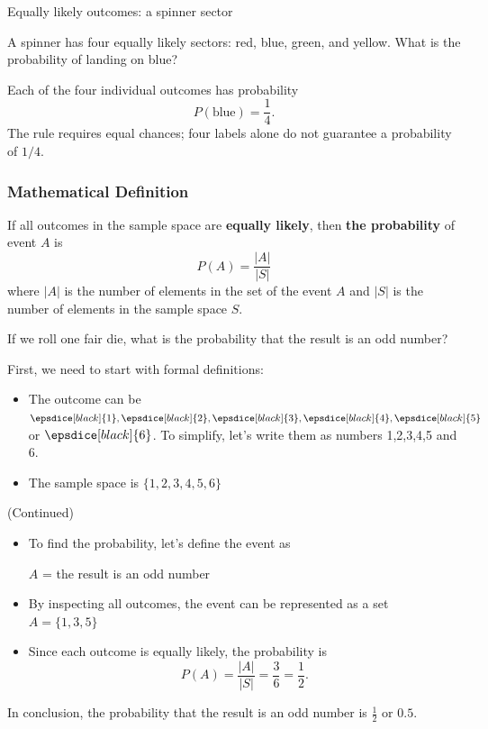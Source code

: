 \begin{frame}[t]{Equally likely outcomes: a spinner sector}
\small
\begin{ex}
A spinner has four equally likely sectors: red, blue, green, and yellow. What is the probability of landing on blue?
\end{ex}
\begin{sol}
Each of the four individual outcomes has probability\[P(\text{blue})=\frac14.\] The rule requires equal chances; four labels alone do not guarantee a probability of $1/4$.
\end{sol}
\end{frame}


\begin{frame}
\frametitle{Mathematical Definition}
\begin{defn}{}{}
If all outcomes in the sample space are \textbf{equally likely}, then \textbf{the probability} of event $A$ is 
\begin{equation}
P(A) = \frac{|A|}{|S|}
\end{equation}
where $|A|$ is the number of elements in the set of the event $A$ and $|S|$ is the number of elements in the sample space $S$. \pause
\end{defn}
\end{frame}


\begin{frame}[t]
\begin{ex}
If we roll one fair die, what is the probability that the result is an odd number?
\end{ex}
\begin{sol}
First, we need to start with formal definitions:
\begin{itemize}
\item The outcome can be $\epsdice[black]{1}, \epsdice[black]{2}, \epsdice[black]{3}, \epsdice[black]{4}, \epsdice[black]{5}$ or $\epsdice[black]{6}$. To simplify, let's write them as numbers 1,2,3,4,5 and 6.
\item The sample space is $\{1,2,3,4,5,6\}$
\end{itemize}
\end{sol}
\end{frame}

\begin{frame}
\begin{sol} (Continued)
\begin{itemize}
\item To find the probability, let's define the event as
\begin{center}
$A$ = the result is an odd number
\end{center}
\item By inspecting all outcomes, the event can be represented as a set $A = \{1,3,5\}$
\item Since each outcome is equally likely, the probability is
\[P(A) = \frac{|A|}{|S|} = \frac{3}{6} = \frac{1}{2}.\]
\end{itemize}
In conclusion, the probability that the result is an odd number is $\frac{1}{2}$ or $0.5$.
\end{sol}
\end{frame}

